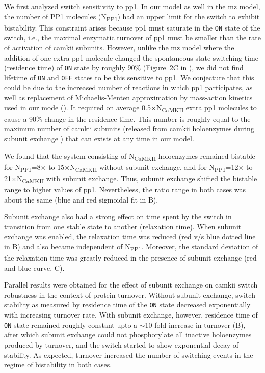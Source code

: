 \documentclass[9pt,lineno,doublespacing]{elife}
\newcommand\SUB[2]{#1\textsubscript{#2}}
\begin{document}
    
We first analyzed switch sensitivity to \gls{pp1}. In our model as well in the
\gls{mz} model, the number of PP1 molecules (\SUB{N}{PP1}) had an upper limit
for the switch to exhibit bistability. This constraint arises because \gls{pp1}
must saturate in the \texttt{ON} state of the switch, i.e., the maximal
enzymatic turnover of \gls{pp1} must be smaller than the rate of activation of
\gls{camkii} subunits.  However, unlike the \gls{mz} model where the addition of
one extra \gls{pp1} molecule changed the spontaneous state switching time
(residence time) of \texttt{ON} state by roughly 90\% (Figure~2C in
\citep{miller_stability_2005}), we did not find lifetime of \texttt{ON} and
\texttt{OFF} states to be this sensitive to \gls{pp1}. We conjecture that this
could be due to the increased number of reactions in which \gls{pp1}
participates, as well as replacement of Michaelis-Menten approximation by
mass-action kinetics used in our mode (). It required on
average 0.5$\times$\SUB{N}{CaMKII} extra \gls{pp1} molecules to cause a 90\%
change in the residence time. This number is roughly equal to the maximum number
of \gls{camkii} subunits (released from \gls{camkii} holoenzymes during subunit
exchange ) that can exists at any time in our model.

We found that the system consisting of \SUB{N}{CaMKII} holoenzymes remained
bistable for \SUB{N}{PP1}=8$\times$ to 15$\times$\SUB{N}{CaMKII} without subunit
exchange, and for \SUB{N}{PP1}=12$\times$ to 21$\times$\SUB{N}{CaMKII} with
subunit exchange. Thus, subunit exchange shifted the bistable range to higher
values of \gls{pp1}. Nevertheless, the ratio range in both cases was about the
same (blue and red sigmoidal fit in B).

Subunit exchange also had a strong effect on time spent by the switch in
transition from one stable state to another (relaxation time). When subunit
exchange was enabled, the relaxation time was reduced (red v/s blue dotted line
in B) and also became independent of \SUB{N}{PP1}.  Moreover,
the standard deviation of the relaxation time was greatly reduced in the
presence of subunit exchange (red and blue curve, C).

Parallel results were obtained for the effect of subunit exchange on
\gls{camkii} switch robustness in the context of protein turnover. Without
subunit exchange, switch stability as measured by residence time of the
\texttt{ON} state decreased exponentially with increasing turnover rate. With
subunit exchange, however, residence time of \texttt{ON} state remained roughly
constant upto a $\sim$10 fold increase in turnover (B), after
which subunit exchange could not phosphorylate all inactive holoenzymes produced
by turnover, and the switch started to show exponential decay of stability. As
expected, turnover increased the number of switching events in the regime of
bistability in both cases.
\end{document}
